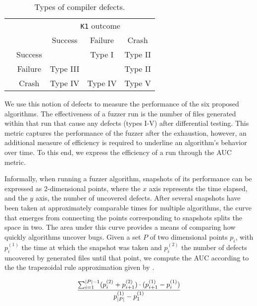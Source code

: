\begin{table}[]
    \centering
    \begin{tabular}{cc|ccc}
        &&\multicolumn{3}{c}{\texttt{K1} outcome}\\
        &&Success & Failure & Crash\\
        \midrule
        \parbox[t]{2mm}{}& Success &  & Type I & Type II \\
        & Failure & Type III &  & Type II\\
        & Crash & Type IV & Type IV & Type V\\
    \end{tabular}
    \caption{Types of compiler defects.}
    \label{tab:defects}
\end{table}


We use this notion of defects to measure the
performance of the six proposed algorithms.
The effectiveness of a fuzzer run is the number
of files generated within that run that cause any defects (types I-V)
after differential testing.
This metric captures the performance of the fuzzer after the exhaustion,
however, an additional measure of efficiency is required to underline
an algorithm's behavior over time.
To this end, we express the efficiency of a run through the
\gls{AUC} metric.

Informally, when running a fuzzer algorithm, snapshots of its performance
can be expressed as 2-dimensional points, where the $x$ axis represents the time elapsed,
and the $y$ axis, the number of uncovered defects.
After several snapshots have been taken at approximately comparable
times for multiple algorithms, the curve that emerges from connecting the points
corresponding to snapshots splits the space in two.
The area under this curve provides a means of comparing how quickly
algorithms uncover bugs.
Given a set $P$ of two dimensional points $p_i$, with $p_i^{(1)}$
the time at which the snapshot was taken and $p_i^{(2)}$ the number of defects
uncovered by generated files until that point,
we compute the \gls{AUC} according to the the trapezoidal rule approximation
given by .

\begin{equation}
    \frac{\sum_{i=1}^{\mid P \mid - 1} \Large( p_i^{(2)} + p_{i + 1}^{(2)} \Large)
\cdot (p_{i + 1}^{(1)} - p_{i}^{(1)})}{p_{\mid P \mid}^{(1)} - p_1^{(1)}}
\label{eq:auc}
\end{equation}

